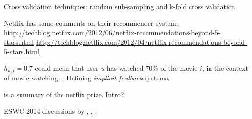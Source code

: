 Cross validation techniques:
    random sub-sampling and k-fold cross validation

Netflix has some comments on their recommender system.
\url{http://techblog.netflix.com/2012/06/netflix-recommendations-beyond-5-stars.html}
\url{http://techblog.netflix.com/2012/04/netflix-recommendations-beyond-5-stars.html}

$h_{u, i} = 0.7$ could mean that user $u$ has watched 70\% of the movie $i$, in the context of movie watching. \citep{hu2008collaborative}. Defining \textit{implicit feedback} systems.

\citep{bennett2007netflix} is a summary of the netflix prize. Intro?

ESWC 2014 discussions by \citep{di2014linked}, \citep{heitmann2014semstim}, \citep{ostuni2014linked}.


